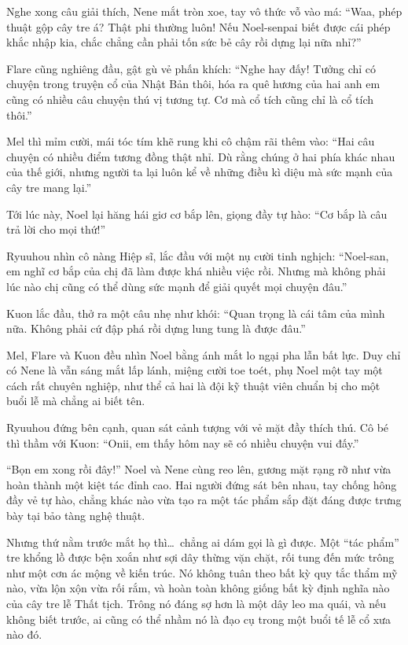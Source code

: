 \documentclass[../main.tex]{subfiles}
\begin{document}
Nghe xong câu giải thích, Nene mắt tròn xoe, tay vô thức vỗ vào má: ``Waa, phép thuật gộp cây tre á? Thật phi thường luôn! Nếu Noel-senpai biết được cái phép khắc nhập kia, chắc chẳng cần phải tốn sức bẻ cây rồi dựng lại nữa nhỉ?''

Flare cũng nghiêng đầu, gật gù vẻ phấn khích: ``Nghe hay đấy! Tưởng chỉ có chuyện trong truyện cổ của Nhật Bản thôi, hóa ra quê hương của hai anh em cũng có nhiều câu chuyện thú vị tương tự. Cơ mà cổ tích cũng chỉ là cổ tích thôi.''

Mel thì mỉm cười, mái tóc tím khẽ rung khi cô chậm rãi thêm vào: ``Hai câu chuyện có nhiều điểm tương đồng thật nhỉ. Dù rằng chúng ở hai phía khác nhau của thế giới, nhưng người ta lại luôn kể về những điều kì diệu mà sức mạnh của cây tre mang lại.''

Tới lúc này, Noel lại hăng hái giơ cơ bắp lên, giọng đầy tự hào: ``Cơ bắp là câu trả lời cho mọi thứ!''

Ryuuhou nhìn cô nàng Hiệp sĩ, lắc đầu với một nụ cười tinh nghịch: ``Noel-san, em nghĩ cơ bắp của chị đã làm được khá nhiều việc rồi. Nhưng mà không phải lúc nào chị cũng có thể dùng sức mạnh để giải quyết mọi chuyện đâu.''

Kuon lắc đầu, thở ra một câu nhẹ như khói: ``Quan trọng là cái tâm của mình nữa. Không phải cứ đập phá rồi dựng lung tung là được đâu.''

Mel, Flare và Kuon đều nhìn Noel bằng ánh mắt lo ngại pha lẫn bất lực. Duy chỉ có Nene là vẫn sáng mắt lấp lánh, miệng cười toe toét, phụ Noel một tay một cách rất chuyên nghiệp, như thể cả hai là đội kỹ thuật viên chuẩn bị cho một buổi lễ mà chẳng ai biết tên.

Ryuuhou đứng bên cạnh, quan sát cảnh tượng với vẻ mặt đầy thích thú. Cô bé thì thầm với Kuon: ``Onii, em thấy hôm nay sẽ có nhiều chuyện vui đấy.''

\ct

``Bọn em xong rồi đây!'' Noel và Nene cùng reo lên, gương mặt rạng rỡ như vừa hoàn thành một kiệt tác đỉnh cao. Hai người đứng sát bên nhau, tay chống hông đầy vẻ tự hào, chẳng khác nào vừa tạo ra một tác phẩm sắp đặt đáng được trưng bày tại bảo tàng nghệ thuật.


Nhưng thứ nằm trước mắt họ thì\dots\ chẳng ai dám gọi là gì được. Một ``tác phẩm'' tre khổng lồ được bện xoắn như sợi dây thừng vặn chặt, rối tung đến mức trông như một cơn ác mộng về kiến trúc. Nó không tuân theo bất kỳ quy tắc thẩm mỹ nào, vừa lộn xộn vừa rối rắm, và hoàn toàn không giống bất kỳ định nghĩa nào của cây tre lễ Thất tịch. Trông nó đáng sợ hơn là một dây leo ma quái, và nếu không biết trước, ai cũng có thể nhầm nó là đạo cụ trong một buổi tế lễ cổ xưa nào đó.
\end{document}
